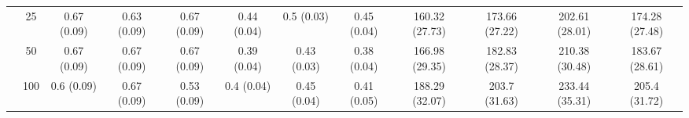 \documentclass[11pt]{article}
\theoremstyle{definition}
\begin{document}
\begin{landscape}
\begin{table}[b]
\begin{center}
{\begin{tabular}{cc|ccc|ccc|cccc|}
  & 25  & 0.67 (0.09) & 0.63 (0.09) & 0.67 (0.09) & 0.44 (0.04) & 0.5 (0.03) & 0.45 (0.04) & 160.32 (27.73) & 173.66 (27.22) & 202.61 (28.01) & 174.28 (27.48) \\ 
  & 50  & 0.67 (0.09) & 0.67 (0.09) & 0.67 (0.09) & 0.39 (0.04) & 0.43 (0.03) & 0.38 (0.04) & 166.98 (29.35) & 182.83 (28.37) & 210.38 (30.48) & 183.67 (28.61) \\ 
  & 100  & 0.6 (0.09) & 0.67 (0.09) & 0.53 (0.09) & 0.4 (0.04) & 0.45 (0.04) & 0.41 (0.05) & 188.29 (32.07) & 203.7 (31.63) & 233.44 (35.31) & 205.4 (31.72) \\
\end{tabular}}
   \end{center}
\end{table}
\end{landscape}



\end{document}
